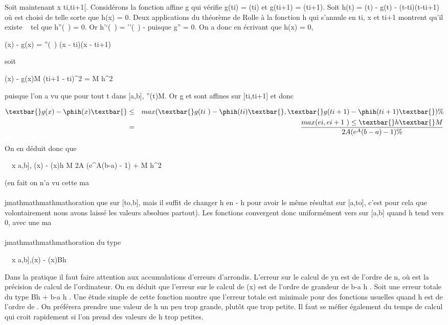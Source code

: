 Soit maintenant x \in{]}ti,ti+1{[}. Considérons la
fonction affine g qui vérifie g(ti) = \phi(ti) et
g(ti+1) = \phi(ti+1). Soit h(t) = \phi(t) - g(t) - \mu
(t-ti)(t-ti+1)  où \mu est
choisi de telle sorte que h(x) = 0. Deux applications du théorème de
Rolle à la fonction h qui s'annule en ti, x et ti+1
montrent qu'il existe \xi~ tel que h''(\xi~) = 0. Or h'`(\xi~) = \phi''(\xi~) - \mu
puisque g'' = 0. On a donc en écrivant que h(x) = 0,

\phi(x) - g(x) = \phi''(\xi~) (x - ti)(x - ti+1)

soit

\textbar{}\phi(x) - g(x)\textbar{}\leq M (ti+1 -
ti)^2  = M h^2

puisque l'on a vu que pour tout t dans {[}a,b{]},
\textbar{}\phi''(t)\textbar{}\leq M. Or g et \phih sont affines sur
{[}ti,ti+1{]} et donc

\begin{align*} \textbar{}g(x) -
\phih(x)\textbar{}& \leq&
max(\textbar{}g(ti~) -
\phih(ti)\textbar{},\textbar{}g(ti+1) -
\phih(ti+1)\textbar{})\%&
\\ & =&
max(ei,ei+1~)
\leq\textbar{}h\textbar{} M \over 2A
(e^A(b-a) - 1) \%& \\
\end{align*}

On en déduit donc que

\forall~~x \in {[}a,b{]}, \textbar{}\phi(x) -
\phih(x)\textbar{}\leq\textbar{}h\textbar{} M \over
2A (e^A(b-a) - 1) + M h^2 

(en fait on n'a vu cette ma\\\\jmathmathmathmathoration que sur {[}to,b{]}, mais
il suffit de changer h en - h pour avoir le même résultat sur
{[}a,to{]}, c'est pour cela que volontairement nous avons
laissé les valeurs absolues partout). Les fonctions \phih
convergent donc uniformément vers \phi sur {[}a,b{]} quand h tend vers 0,
avec une ma\\\\jmathmathmathmathoration du type

\forall~~x \in {[}a,b{]},\textbar{}\phi(x) -
\phih(x)\textbar{}\leq B\textbar{}h\textbar{}

Dans la pratique il faut faire attention aux accumulations d'erreurs
d'arrondis. L'erreur sur le calcul de yn est de l'ordre de n\epsilon,
où \epsilon est la précision de calcul de l'ordinateur. On en déduit que
l'erreur sur le calcul de \phih(x) est de l'ordre de grandeur de
 b-a \over h \epsilon. Soit une erreur totale du type Bh +
b-a \over h \epsilon. Une étude simple de cette fonction
montre que l'erreur totale est minimale pour des fonctions usuelles
quand h est de l'ordre de \sqrt\epsilon. On préférera
prendre une valeur de h un peu trop grande, plutôt que trop petite. Il
faut se méfier également du temps de calcul qui croit rapidement si l'on
prend des valeurs de h trop petites.

